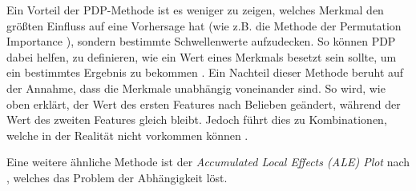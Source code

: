 
Ein Vorteil der PDP-Methode ist es weniger zu zeigen, welches Merkmal den größten Einfluss auf eine Vorhersage hat (wie z.B. die Methode der Permutation Importance ), sondern bestimmte Schwellenwerte aufzudecken. So können PDP dabei helfen, zu definieren, wie ein Wert eines Merkmals besetzt sein sollte, um ein bestimmtes Ergebnis zu bekommen \cite{Gianfagna.2021}. 
Ein Nachteil dieser Methode beruht auf der Annahme, dass die Merkmale unabhängig voneinander sind. So wird, wie oben erklärt, der Wert des ersten Features nach Belieben geändert, während der Wert des zweiten Features gleich bleibt. Jedoch führt dies zu Kombinationen, welche in der Realität nicht vorkommen können \cite{molnar2022}.

Eine weitere ähnliche Methode ist der \emph{Accumulated Local Effects (ALE) Plot} nach \textcite{apley2020visualizing}, welches das Problem der Abhängigkeit löst.

